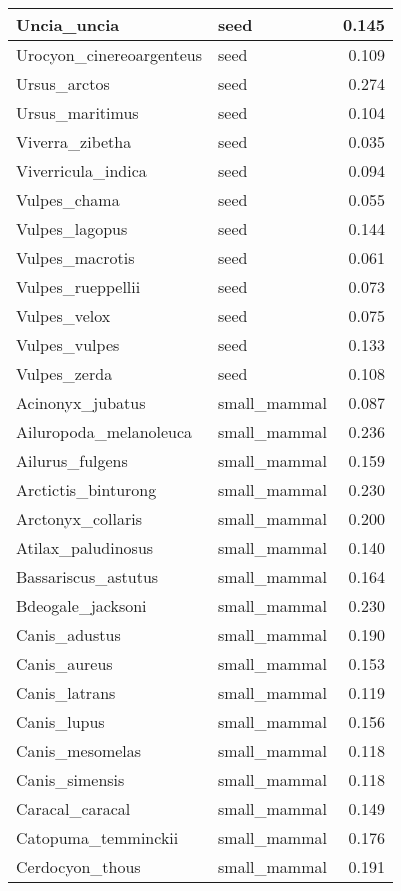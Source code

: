 \begin{table}
\begin{tabular}[t]{l|l|r}
\hline
Uncia\_uncia & seed & 0.145\\
\hline
Urocyon\_cinereoargenteus & seed & 0.109\\
\hline
Ursus\_arctos & seed & 0.274\\
\hline
Ursus\_maritimus & seed & 0.104\\
\hline
Viverra\_zibetha & seed & 0.035\\
\hline
Viverricula\_indica & seed & 0.094\\
\hline
Vulpes\_chama & seed & 0.055\\
\hline
Vulpes\_lagopus & seed & 0.144\\
\hline
Vulpes\_macrotis & seed & 0.061\\
\hline
Vulpes\_rueppellii & seed & 0.073\\
\hline
Vulpes\_velox & seed & 0.075\\
\hline
Vulpes\_vulpes & seed & 0.133\\
\hline
Vulpes\_zerda & seed & 0.108\\
\hline
Acinonyx\_jubatus & small\_mammal & 0.087\\
\hline
Ailuropoda\_melanoleuca & small\_mammal & 0.236\\
\hline
Ailurus\_fulgens & small\_mammal & 0.159\\
\hline
Arctictis\_binturong & small\_mammal & 0.230\\
\hline
Arctonyx\_collaris & small\_mammal & 0.200\\
\hline
Atilax\_paludinosus & small\_mammal & 0.140\\
\hline
Bassariscus\_astutus & small\_mammal & 0.164\\
\hline
Bdeogale\_jacksoni & small\_mammal & 0.230\\
\hline
Canis\_adustus & small\_mammal & 0.190\\
\hline
Canis\_aureus & small\_mammal & 0.153\\
\hline
Canis\_latrans & small\_mammal & 0.119\\
\hline
Canis\_lupus & small\_mammal & 0.156\\
\hline
Canis\_mesomelas & small\_mammal & 0.118\\
\hline
Canis\_simensis & small\_mammal & 0.118\\
\hline
Caracal\_caracal & small\_mammal & 0.149\\
\hline
Catopuma\_temminckii & small\_mammal & 0.176\\
\hline
Cerdocyon\_thous & small\_mammal & 0.191\\
\hline

\end{tabular}
\end{table}
